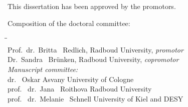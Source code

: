 \begin{titlepage}
    \thispagestyle{empty}

    \noindent This dissertation has been approved by the promotors.

    \bigskip
    \noindent Composition of the doctoral committee:
    
    \begin{tabbing}
        \hspace{\tabcolsep}\=\hspace{0.33\textwidth}\=\hspace{0.66\textwidth}                   \\[-3\medskipamount]
        \> Prof.\ dr.\ Britta \ Redlich,    \> Radboud University, \textit{promotor}      \\
        \> Dr.\ Sandra \ Br\"{u}nken,        \> Radboud University, \textit{copromotor}    \\[\medskipamount]
        \>\textit{Manuscript committee:}  \\[\smallskipamount]
        \> dr. \ Oskar Asvany            \> University of Cologne \\
        \> prof. \ dr.\ Jana \ Roithova            \> Radboud University \\
        \> prof. \ dr.\ Melanie \ Schnell   \> University of Kiel and DESY \\[\medskipamount]
    \end{tabbing}

\end{titlepage}
\cleardoublepage
